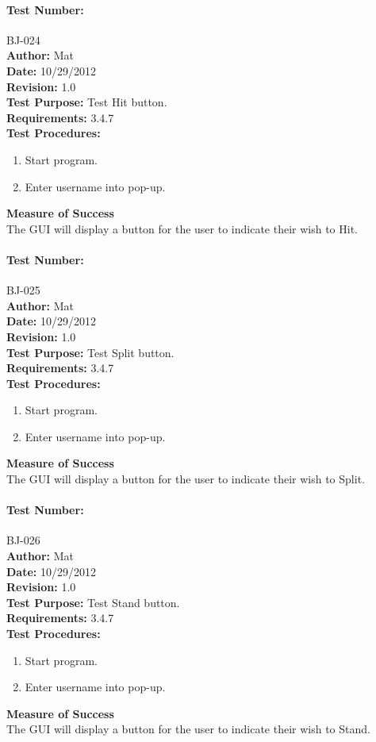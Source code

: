 \documentclass{article}
\begin{document}
\paragraph{Test Number:} BJ-024\\
\textbf{Author:} Mat\\
\textbf{Date:} 10/29/2012\\
\textbf{Revision:} 1.0\\
\textbf{Test Purpose:} Test Hit button.\\
\textbf{Requirements:} 3.4.7 \\
\textbf{Test Procedures:} 
\begin{enumerate}
\item Start program.
\item Enter username into pop-up.
\end{enumerate}
\textbf{Measure of Success}\\The GUI will display a button for the user to indicate their wish to Hit.
\paragraph{Test Number:} BJ-025\\
\textbf{Author:} Mat\\
\textbf{Date:} 10/29/2012\\
\textbf{Revision:} 1.0\\
\textbf{Test Purpose:} Test Split button.\\
\textbf{Requirements:} 3.4.7 \\
\textbf{Test Procedures:} 
\begin{enumerate}
\item Start program.
\item Enter username into pop-up.
\end{enumerate}
\textbf{Measure of Success}\\The GUI will display a button for the user to indicate their wish to Split.
\paragraph{Test Number:} BJ-026\\
\textbf{Author:} Mat\\
\textbf{Date:} 10/29/2012\\
\textbf{Revision:} 1.0\\
\textbf{Test Purpose:} Test Stand button.\\
\textbf{Requirements:} 3.4.7 \\
\textbf{Test Procedures:} 
\begin{enumerate}
\item Start program.
\item Enter username into pop-up.
\end{enumerate}
\textbf{Measure of Success}\\The GUI will display a button for the user to indicate their wish to Stand.
\end{document}
